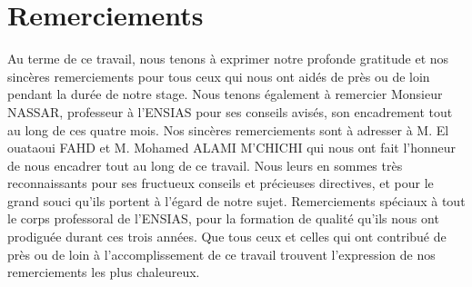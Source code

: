 \chapter*{Remerciements}
\begin{onehalfspace}
Au terme de ce travail, nous tenons à exprimer notre profonde gratitude et nos sincères remerciements pour tous ceux qui nous ont aidés de près ou de loin pendant la durée de notre stage.
\newline
\newline
Nous tenons également à remercier Monsieur NASSAR, professeur à l’ENSIAS pour ses conseils avisés, son encadrement tout au long de ces quatre mois. Nos sincères remerciements sont à adresser à M. El ouataoui FAHD et M. Mohamed ALAMI M’CHICHI qui nous ont fait l'honneur de nous encadrer tout au long de ce travail. Nous leurs en sommes très reconnaissants pour ses fructueux conseils et précieuses directives, et pour le grand souci qu’ils portent à l’égard de notre sujet. 
\newline
\newline
Remerciements spéciaux à tout le corps professoral de l’ENSIAS, pour la formation de qualité qu’ils nous ont prodiguée durant ces trois années. Que tous ceux et celles qui ont contribué de près ou de loin à l’accomplissement de ce travail trouvent l’expression de nos remerciements les plus chaleureux.
\end{onehalfspace}